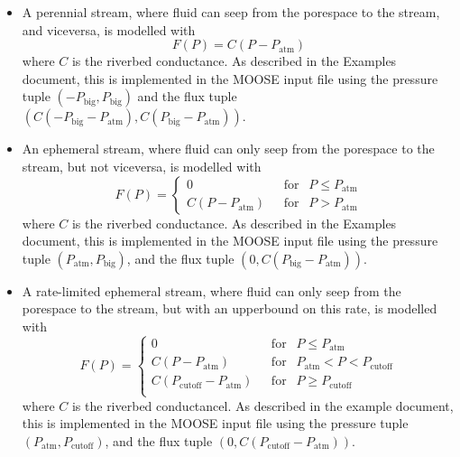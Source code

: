 \documentclass[]{scrreprt}
\begin{document}
\begin{itemize}
\item A perennial stream, where fluid can seep from the porespace to
  the stream, and viceversa,  is modelled with
\begin{equation}
F(P) = C(P - P_{\mathrm{atm}})
\end{equation}
where $C$ is the riverbed conductance.  As described in the Examples
document, this is implemented in the
MOOSE input file using the pressure tuple $(-P_{\mathrm{big}},
P_{\mathrm{big}})$ and the flux tuple $(C(-P_{\mathrm{big}} -
P_{\mathrm{atm}}), C(P_{\mathrm{big}} - P_{\mathrm{atm}}) )$.

\item An ephemeral stream, where fluid can only seep from the porespace
  to the stream, but not viceversa, is modelled with
\begin{equation}
F(P) = \left\{
\begin{array}{ll}
0 & \ \ \ \mbox{for } \ \ P\leq P_{\mathrm{atm}} \\
C(P - P_{\mathrm{atm}}) & \ \ \ \mbox{for } \ \ P > P_{\mathrm{atm}}
\end{array}
\right.
\end{equation}
where $C$ is the riverbed conductance.  As described in the Examples
document, this is implemented in the
MOOSE input file using the pressure tuple $(P_{\mathrm{atm}},
P_{\mathrm{big}})$, and the flux tuple $(0, C(P_{\mathrm{big}} -
P_{\mathrm{atm}}) )$.

\item A rate-limited ephemeral stream, where fluid can only seep from
  the porespace to the stream, but with an upperbound on this rate, is
  modelled with
\begin{equation}
F(P) = \left\{
\begin{array}{ll}
0 & \ \ \ \mbox{for } \ \ P\leq P_{\mathrm{atm}} \\
C(P - P_{\mathrm{atm}}) & \ \ \ \mbox{for } \ \ P_{\mathrm{atm}} < P <
P_{\mathrm{cutoff}} \\
C(P_{\mathrm{cutoff}} - P_{\mathrm{atm}}) & \ \ \ \mbox{for } \ \ P \geq
P_{\mathrm{cutoff}} \\
\end{array}
\right.
\end{equation}
where $C$ is the riverbed conductancel.  As described in the example
document, this is implemented in the
MOOSE input file using the pressure tuple $(P_{\mathrm{atm}},
P_{\mathrm{cutoff}})$, and the flux tuple $(0, C(P_{\mathrm{cutoff}} -
P_{\mathrm{atm}}) )$.
\end{itemize}
\end{document}
